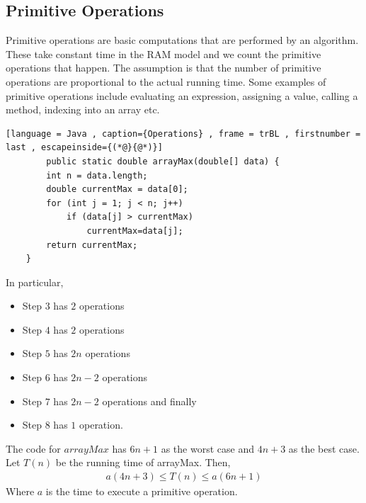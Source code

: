 \documentclass[a4paper]{article}
\theoremstyle{plain}
\theoremstyle{definition}
\newtheorem{exmp}{Example}[section]
\theoremstyle{remark}
\begin{document}
\subsection{Primitive Operations}
Primitive operations are basic computations that are performed by an algorithm. These take constant time in the RAM model and we count the primitive operations that happen. The assumption is that the number of primitive operations are proportional to the actual running time. Some examples of primitive operations include evaluating an expression, assigning a value, calling a method, indexing into an array etc.
\begin{tcolorbox}[colback=black!3!white,colframe=black!60!white,title=\begin{exmp}Operations in a code \label{Operations in a code}\end{exmp}]
        \begin{lstlisting}[language = Java , caption={Operations} , frame = trBL , firstnumber = last , escapeinside={(*@}{@*)}]
        public static double arrayMax(double[] data) {
		int n = data.length;
		double currentMax = data[0];
		for (int j = 1; j < n; j++)
			if (data[j] > currentMax)
				currentMax=data[j];
		return currentMax;
	}
        \end{lstlisting}
	In particular,
	\begin{itemize}
		\item Step $3$ has $2$ operations
		\item Step $4$ has $2$ operations
		\item Step $5$ has $2n$ operations
		\item Step $6$ has $2n-2$ operations
		\item Step $7$ has $2n-2$ operations and finally
		\item Step $8$ has $1$ operation.
	\end{itemize}
	The code for $arrayMax$ has $6n+1$ as the worst case and $4n+3$ as the best case. Let $T(n)$ be the running time of arrayMax. Then, 
	\begin{align*}
		a(4n+3) \le T(n) \le a(6n+1)
	\end{align*}
Where $a$ is the time to execute a primitive operation.
\end{tcolorbox}
\end{document}

